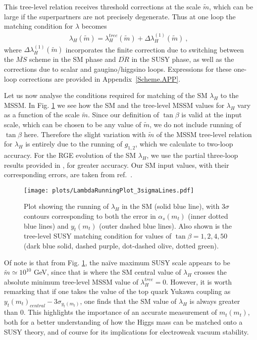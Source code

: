 \documentclass[12pt]{article}
\newcommand{\MS}{\overline{MS}}
\newcommand{\DR}{\overline{DR}}
\newcommand{\mS}{\tilde{m}}
\begin{document}
This tree-level relation receives threshold corrections at the scale $\mS$, which can be large if the superpartners are not precisely degenerate. Thus at one loop the matching condition for $\lambda$ becomes
\begin{align}
\lambda_H(\mS) = \lambda_H^{tree} (\mS) + \Delta\lambda_H^{(1)}  (\mS) \ ,
\label{1LLambda.EQ}
\end{align}
where $ \Delta\lambda_H^{(1)}  (\mS)$ incorporates the finite correction due to switching between the $\MS$ scheme in the SM phase and $\DR$ in the SUSY phase, as well as the corrections due to scalar and gaugino/higgsino loops. Expressions for these one-loop corrections are provided in Appendix~\ref{Scheme.APP}.

Let us now analyse the conditions  required for matching of the SM $\lambda_H$ to the MSSM. In Fig. \ref{LambdaRunning.FIG}  we see how the SM and the tree-level MSSM values for $\lambda_H$ vary as a function of the scale $\mS$. Since our definition of $\tan\beta$ is valid at the input scale, which can be chosen to be any value of $\mS$, we do not include running of $\tan\beta$ here. Therefore the slight variation with $\mS$ of the MSSM tree-level relation for $\lambda_H$ is entirely due to the running of $g_{1,2}$, which we calculate to two-loop accuracy. For the RGE evolution of the SM $\lambda_H$, we use the partial three-loop results provided in \cite{Bagnaschi:2014rsa}, for greater accuracy. Our SM input values, with their corresponding errors, are taken from ref.~\cite{Agashe:2014kda}.


\begin{figure}[t]
\centering
\texttt{[image: plots/LambdaRunningPlot\_3sigmaLines.pdf]}
\caption{Plot showing the running of $\lambda_H$ in the SM (solid blue line), with 3$\sigma$ contours corresponding to both the error in $\alpha_s(m_t)$ (inner dotted blue lines) and $y_t(m_t)$ (outer dashed blue lines). Also shown is the tree-level SUSY matching condition for values of $\tan \beta = 1, 2, 4, 50$ (dark blue solid, dashed purple, dot-dashed olive, dotted green).}
\label{LambdaRunning.FIG}
\end{figure}

Of note is that from Fig. \ref{LambdaRunning.FIG}, the na\"ive maximum SUSY scale appears to be $\mS \simeq 10^{10}$ GeV, since that is where the SM central value of $\lambda_H$ crosses the absolute minimum tree-level MSSM value of $\lambda^{tree}_H = 0$. However, it is worth remarking that if one takes the value of the top quark Yukawa coupling as $y_t(m_t)_{central}-3\sigma_{y_t(m_t)}$, one finds that the SM value of $\lambda_H$ is always greater than 0. This highlights the importance of an accurate measurement of $m_t(m_t)$, both for a better understanding of how the Higgs mass can be matched onto a SUSY theory, and of course for its implications for electroweak vacuum stability.
\end{document}
